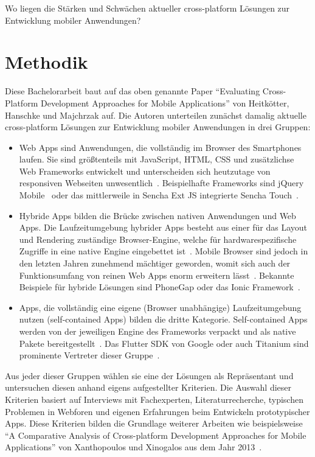 Wo liegen die Stärken und Schwächen aktueller cross-platform Lösungen zur Entwicklung mobiler Anwendungen?

\section*{Methodik}

Diese Bachelorarbeit baut auf das oben genannte Paper “Evaluating Cross-Platform Development Approaches for Mobile Applications” von Heitkötter, Hanschke und Majchrzak auf. Die Autoren unterteilen zunächst damalig aktuelle cross-platform Lösungen zur Entwicklung mobiler Anwendungen in drei Gruppen:
\begin{itemize}
    \item Web Apps sind Anwendungen, die vollständig im Browser des Smartphones laufen. Sie sind größtenteils mit JavaScript, HTML, CSS und zusätzlichse Web Frameworks entwickelt und unterscheiden sich heutzutage von responsiven Webseiten unwesentlich~\cite{eva12}.
    Beispielhafte Frameworks sind jQuery Mobile~\cite{jquery} oder das mittlerweile in Sencha Ext JS integrierte Sencha Touch~\cite{sencha}.
    
    \item Hybride Apps bilden die Brücke zwischen nativen Anwendungen und Web Apps. Die Laufzeitumgebung hybrider Apps besteht aus einer für das Layout und Rendering zuständige Browser-Engine, welche für hardwarespezifische Zugriffe in eine native Engine eingebettet ist~\cite{eva12}.
    Mobile Browser sind jedoch in den letzten Jahren zunehmend mächtiger geworden, womit sich auch der Funktionsumfang von reinen Web Apps enorm erweitern lässt~\cite{gdev}.
    Bekannte Beispiele für hybride Lösungen sind PhoneGap oder das Ionic Framework~\cite{phonegap,ionic}.
    
    \item Apps, die vollständig eine eigene (Browser unabhängige) Laufzeitumgebung nutzen (self-contained Apps) bilden die dritte Kategorie. Self-contained Apps werden von der jeweiligen Engine des Frameworks verpackt und als native Pakete bereitgestellt~\cite{eva12}. Das Flutter SDK von Google oder auch Titanium sind prominente Vertreter dieser Gruppe~\cite{flutter,tita}.
    
\end{itemize}
Aus jeder dieser Gruppen wählen sie eine der Lösungen als Repräsentant und untersuchen diesen anhand eigens aufgestellter Kriterien. Die Auswahl dieser Kriterien basiert auf Interviews mit Fachexperten, Literaturrecherche, typischen Problemen in Webforen und eigenen Erfahrungen beim Entwickeln prototypischer Apps. Diese Kriterien bilden die Grundlage weiterer Arbeiten wie beispielsweise “A Comparative Analysis of Cross-platform Development Approaches for Mobile Applications” von Xanthopoulos und Xinogalos aus dem Jahr 2013~\cite{compa13}.
